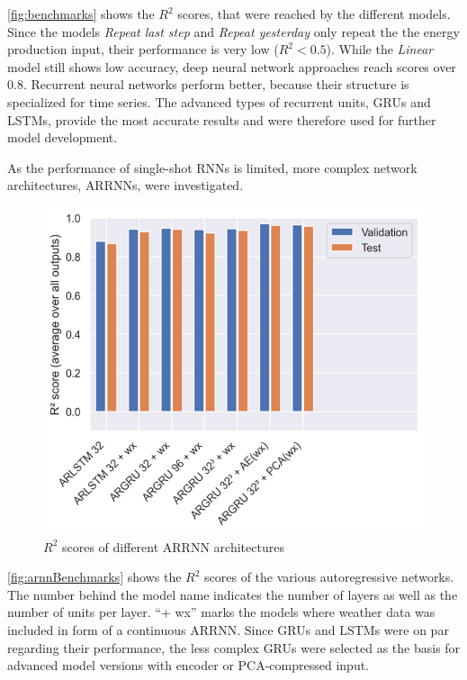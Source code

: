 \documentclass[11pt,table]{article}
\begin{document}
\autoref{fig:benchmarks} shows the $R^2$ scores, that were reached by the different models. Since the models \textit{Repeat last step} and \textit{Repeat yesterday} only repeat the the energy production input, their performance is very low ($R^2 < 0.5$). While the \textit{Linear} model still shows low accuracy, deep neural network approaches reach scores over 0.8. Recurrent neural networks perform better, because their structure is specialized for time series. The advanced types of recurrent units, \acp{GRU} and \acp{LSTM}, provide the most accurate results and were therefore used for further model development.

As the performance of single-shot \acp{RNN} is limited, more complex network architectures, \acp{ARRNN}, were investigated.
\begin{figure}[h!]
	\centering
	\includegraphics[scale=0.6]{figures/arnnCompare.png}
	\caption{$R^2$ scores of different \ac{ARRNN} architectures}
	\label{fig:arnnBenchmarks}
\end{figure}

\autoref{fig:arnnBenchmarks} shows the $R^2$ scores of the various autoregressive networks. The number behind the model name indicates the number of layers as well as the number of units per layer. 
\enquote{+ wx} marks the models where weather data was included in form of a continuous \ac{ARRNN}. 
Since \acp{GRU} and \acp{LSTM} were on par regarding their performance, the less complex \acp{GRU} were selected as the basis for advanced model versions with encoder or \ac{PCA}-compressed input.
\end{document}
